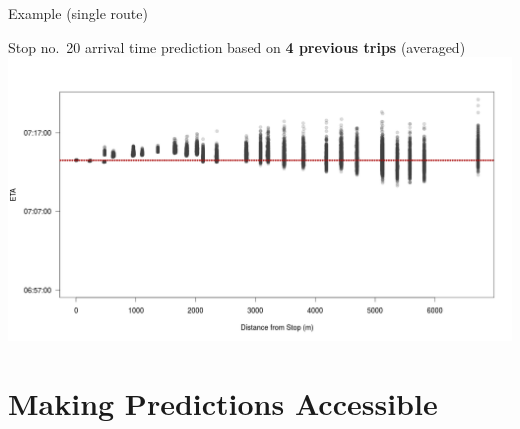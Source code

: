 \documentclass[10pt,t]{beamer}
\begin{document}
\begin{frame}{Example (single route)}
\begin{overprint}
    \vspace{2em}
    Stop no.~20 arrival time prediction based on \textbf{4 previous trips} (averaged)
    \centering
    \includegraphics[width=1\textwidth]{figs/r274/TRIP5_arrival_20_hist.png}
  \end{overprint}
\end{frame}


  
  
  



\section{Making Predictions Accessible}
\end{document}
